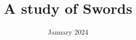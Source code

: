 \documentclass{article}
\title{A study of Swords}
\date{January 2024}
\begin{document}
\maketitle

\pagebreak

\tableofcontents

\pagebreak

\printbibliography

\pagebreak
\end{document}
